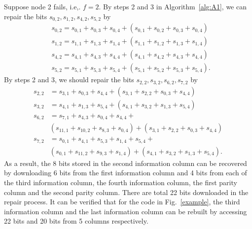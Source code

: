 \documentclass[conference]{IEEEtran}
\begin{document}
Suppose node 2 fails, i.e,. $f=2$. By steps 2 and 3 in Algorithm~\ref{alg:A1}, we can repair the bits $s_{0,2},s_{1,2},s_{4,2},s_{5,2}$ by
\begin{align*}
& s_{0,2}=s_{0,1}+s_{0,3}+s_{0,4}+(s_{0,1}+s_{0,2}+s_{0,3}+s_{0,4}) \\
& s_{1,2}=s_{1,1}+s_{1,3}+s_{1,4}+(s_{1,1}+s_{1,2}+s_{1,3}+s_{1,4}) \\
& s_{4,2}=s_{4,1}+s_{4,3}+s_{4,4}+(s_{4,1}+s_{4,2}+s_{4,3}+s_{4,4}) \\
& s_{5,2}=s_{5,1}+s_{5,3}+s_{5,4}+(s_{5,1}+s_{5,2}+s_{5,3}+s_{5,4}).
\end{align*}
By steps 2 and 3, we should repair the bits $s_{2,2},s_{3,2},s_{6,2},s_{7,2}$ by
\begin{align*}
s_{2,2}&=s_{3,1}+s_{0,3}+s_{4,4}+(s_{3,1}+s_{2,2}+s_{0,3}+s_{4,4}) \\
s_{3,2}&=s_{4,1}+s_{1,3}+s_{5,4}+(s_{4,1}+s_{3,2}+s_{1,3}+s_{5,4}) \\
s_{6,2}&=s_{7,1}+s_{4,3}+s_{0,4}+s_{4,4}+\\
&(s_{11,1}+s_{10,2}+s_{8,3}+s_{0,4})+(s_{3,1}+s_{2,2}+s_{0,3}+s_{4,4}) \\
s_{7,2}&=s_{0,1}+s_{4,1}+s_{5,3}+s_{1,4}+s_{5,4}+\\
&(s_{0,1}+s_{11,2}+s_{9,3}+s_{1,4})+(s_{4,1}+s_{3,2}+s_{1,3}+s_{5,4}).
\end{align*}
As a result, the 8 bits stored in the second information column can be recovered by downloading 6 bits from the first information column and 4 bits from each of the third information column, the fourth information column, the first parity column and the second parity column. There are total 22 bits downloaded in the repair process. It can be verified that for the code in Fig.~\ref{example}, the third information column and the last information column can be rebuilt by accessing 22 bits and 20 bits from 5 columns respectively.
\end{document}
